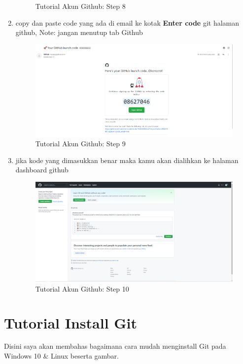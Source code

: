 \begin{enumerate}
\begin{figure}[H]
        \caption{Tutorial Akun Github: Step 8}
\end{figure}
\item copy dan paste code yang ada di email ke kotak \textbf{Enter code} git halaman github, Note: jangan menutup tab Github
\begin{figure}[H]
        \centerline{\includegraphics[scale=0.35]{figures/buat-akun-github/step9}}
        \caption{Tutorial Akun Github: Step 9}
\end{figure}
\item jika kode yang dimasukkan benar maka kamu akan dialihkan ke halaman dashboard github
\begin{figure}[H]
        \centerline{\includegraphics[scale=0.25]{figures/buat-akun-github/step10}}
        \caption{Tutorial Akun Github: Step 10}
\end{figure}
\end{enumerate}


\section{Tutorial Install Git}
Disini saya akan membahas bagaimana cara mudah menginstall Git pada Windows 10 \& Linux beserta gambar.

